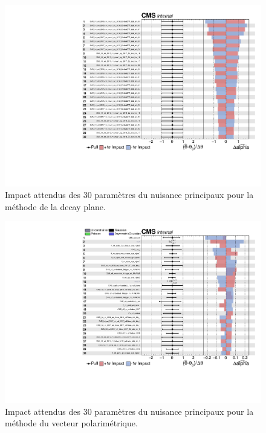 \begin{figure}[]
        \centering
        \includegraphics[scale=0.6]{Chapitre7/Images/impactsdpblind.pdf} 
        \vspace{0.5ex}
    \caption{Impact attendus des 30 paramètres du nuisance principaux pour la méthode de la decay plane.}
    \label{expectednuisancepv}
\end{figure}

\begin{figure}[]
        \centering
        \includegraphics[scale=0.6]{Chapitre7/Images/impactspvblind.pdf} 
        \vspace{0.5ex}
    \caption{Impact attendus des 30 paramètres du nuisance principaux pour la méthode du vecteur polarimétrique.}
    \label{expectednuisancedp}
\end{figure}

